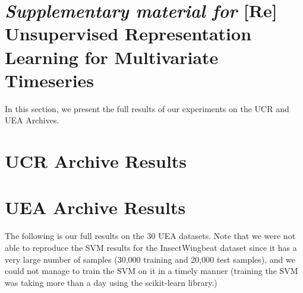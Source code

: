 \documentclass{article}
\begin{document}





\section*{\textit{Supplementary material for} [Re] Unsupervised Representation Learning for Multivariate Timeseries}


In this section, we present the full results of our experiments on the UCR and UEA Archives.

\section{UCR Archive Results}
\drawucrsteps
 

\section{UEA Archive Results}
The following is our full results on the 30 UEA datasets. Note that we were not able to reproduce the SVM results for the InsectWingbeat dataset since it has a very large number of samples (30,000 training and 20,000 test samples), and we could not manage to train the SVM on it in a timely manner (training the SVM was taking more than a day using the scikit-learn library.)

\drawueasteps

%

 



\end{document}
